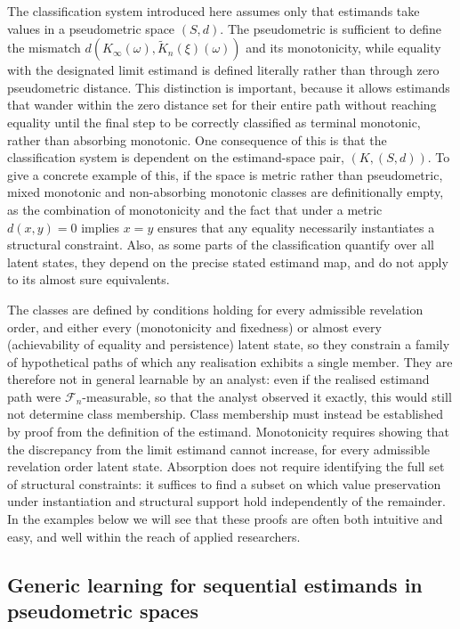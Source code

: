\documentclass{article}
\newcommand{\1}{\mathbbm{1}}
\begin{document}
The classification system introduced here assumes only that estimands take values in a pseudometric space $(S,d)$. The pseudometric is sufficient to define the mismatch $d(K_\infty(\omega), \widetilde K_n(\xi)(\omega))$ and its monotonicity, while equality with the designated limit estimand is defined literally rather than through zero pseudometric distance. This distinction is important, because it allows estimands that wander within the zero distance set for their entire path without reaching equality until the final step to be correctly classified as terminal monotonic, rather than absorbing monotonic. One consequence of this is that the classification system is dependent on the estimand-space pair, $(K,(S,d))$. To give a concrete example of this, if the space is metric rather than pseudometric, mixed monotonic and non-absorbing monotonic classes are definitionally empty, as the combination of monotonicity and the fact that under a metric $d(x,y)=0$ implies $x=y$ ensures that any equality necessarily instantiates a structural constraint. Also, as some parts of the classification quantify over all latent states, they depend on the precise stated estimand map, and do not apply to its almost sure equivalents.

The classes are defined by conditions holding for every admissible revelation order, and either every (monotonicity and fixedness) or almost every (achievability of equality and persistence) latent state, so they constrain a family of hypothetical paths of which any realisation exhibits a single member. They are therefore not in general learnable by an analyst: even if the realised estimand path were $\mathcal{F}_n$-measurable, so that the analyst observed it exactly, this would still not determine class membership. Class membership must instead be established by proof from the definition of the estimand. Monotonicity requires showing that the discrepancy from the limit estimand cannot increase, for every admissible revelation order latent state. Absorption does not require identifying the full set of structural constraints: it suffices to find a subset on which value preservation under instantiation and structural support hold independently of the remainder. In the examples below we will see that these proofs are often both intuitive and easy, and well within the reach of applied researchers.

\subsection{Generic learning for sequential estimands in pseudometric spaces}
\end{document}
